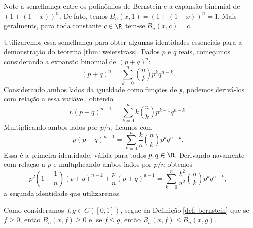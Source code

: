 Note a semelhança entre os polinômios de Bernstein e a expansão binomial de \( ( 1 + ( 1 - x ) )^{ n } \).
De fato, temos \( B_{ n } (x, 1) = ( 1 + ( 1 - x ) )^{ n } = 1 \).
Mais geralmente, para toda constante \( c \in \R \) tem-se \( B_{ n } (x, c) = c \).

Utilizaremos essa semelhança para obter algumas identidades essenciais para a demonstração do teorema \ref{thm: weierstrass}.
Dados \( p \) e \( q \) reais, começamos considerando a expansão binomial de \( ( p + q )^{ n } \): \[
    ( p + q )^{ n } =
    \sum_{ k=0 }^{ n } \binom{n}{k} p^{ k } q^{ n-k }
.\]
Considerando ambos lados da igualdade como funções de \( p \), podemos derivá-los com relação a essa variável, obtendo \[
    n ( p + q )^{ n-1 } =
    \sum_{ k=0 }^{ n } k \binom{n}{k} p^{ k-1 } q^{ n-k }
.\]
Multiplicando ambos lados por \( p/n \), ficamos com
    \begin{equation}
        p ( p + q )^{ n-1 } =
        \sum_{ k=0 }^{ n } \frac{ k }{ n } \binom{n}{k} p^{ k } q^{ n-k }
        \label{eq: id_1}
    .\end{equation}
Essa é a primeira identidade, válida para todos \( p, q \in \R \).
Derivando novamente com relação a \( p \) e multiplicando ambos lados por \( p/n \) obtemos
\begin{equation}
    p^2 \left( 1 - \frac{ 1 }{ n } \right) ( p + q )^{ n-2 } + \frac{ p }{ n } ( p + q )^{ n-1 } =
    \sum_{ k=0 }^{ n } \frac{ k^2 }{ n^2 } \binom{n}{k} p^{ k } q^{ n-k }
    \label{eq: id_2}
,\end{equation}
a segunda identidade que utilizaremos.


Como consideramos \( f, g \in C([0, 1]) \), segue da Definição \ref{def: bernstein} que se \( f \geq 0 \), então \( B_{ n } (x, f) \geq 0 \) e, se \( f \leq g \), então \( B_{ n } (x, f) \leq B_{ n } (x, g) \).

